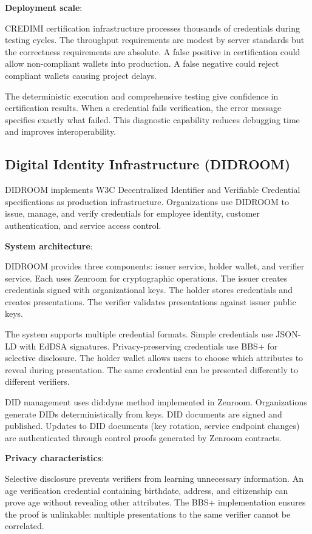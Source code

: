 \textbf{Deployment scale}:

CREDIMI certification infrastructure processes thousands of
credentials during testing cycles. The throughput requirements are
modest by server standards but the correctness requirements are
absolute. A false positive in certification could allow non-compliant
wallets into production. A false negative could reject compliant
wallets causing project delays.

The deterministic execution and comprehensive testing give confidence
in certification results. When a credential fails verification, the
error message specifies exactly what failed. This diagnostic
capability reduces debugging time and improves interoperability.

\subsection{Digital Identity Infrastructure (DIDROOM)}

DIDROOM implements W3C Decentralized Identifier and Verifiable
Credential specifications as production infrastructure. Organizations
use DIDROOM to issue, manage, and verify credentials for employee
identity, customer authentication, and service access control.

\textbf{System architecture}:

DIDROOM provides three components: issuer service, holder wallet, and
verifier service. Each uses Zenroom for cryptographic operations. The
issuer creates credentials signed with organizational keys. The holder
stores credentials and creates presentations. The verifier validates
presentations against issuer public keys.

The system supports multiple credential formats. Simple credentials
use JSON-LD with EdDSA signatures. Privacy-preserving credentials use
BBS+ for selective disclosure. The holder wallet allows users to
choose which attributes to reveal during presentation. The same
credential can be presented differently to different verifiers.

DID management uses did:dyne method implemented in
Zenroom. Organizations generate DIDs deterministically from keys. DID
documents are signed and published. Updates to DID documents (key
rotation, service endpoint changes) are authenticated through control
proofs generated by Zenroom contracts.

\textbf{Privacy characteristics}:

Selective disclosure prevents verifiers from learning unnecessary
information. An age verification credential containing birthdate,
address, and citizenship can prove age without revealing other
attributes. The BBS+ implementation ensures the proof is unlinkable:
multiple presentations to the same verifier cannot be correlated.

